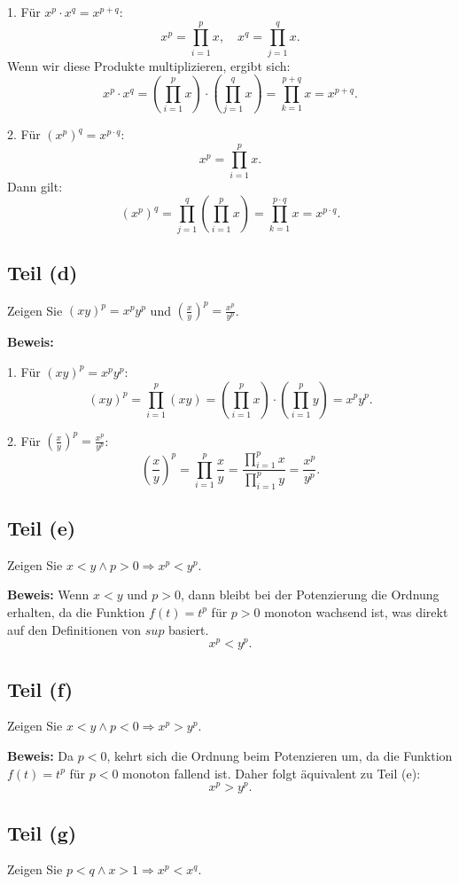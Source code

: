 \documentclass[11pt]{article}
\begin{document}
1. Für \( x^p \cdot x^q = x^{p+q} \):
   \[
   x^p = \prod_{i=1}^{p} x, \quad x^q = \prod_{j=1}^{q} x.
   \]
   Wenn wir diese Produkte multiplizieren, ergibt sich:
   \[
   x^p \cdot x^q = \left( \prod_{i=1}^{p} x \right) \cdot \left( \prod_{j=1}^{q} x \right) = \prod_{k=1}^{p+q} x = x^{p+q}.
   \]

2. Für \( (x^p)^q = x^{p \cdot q} \):
   \[
   x^p = \prod_{i=1}^{p} x.
   \]
   Dann gilt:
   \[
   (x^p)^q = \prod_{j=1}^{q} \left( \prod_{i=1}^{p} x \right) = \prod_{k=1}^{p \cdot q} x = x^{p \cdot q}.
   \]

\subsection*{Teil (d)}
Zeigen Sie \( (xy)^p = x^p y^p \) und \( \left( \frac{x}{y} \right)^p = \frac{x^p}{y^p} \).

\textbf{Beweis:}

1. Für \( (xy)^p = x^p y^p \):
   \[
   (xy)^p = \prod_{i=1}^{p} (xy) = \left( \prod_{i=1}^{p} x \right) \cdot \left( \prod_{i=1}^{p} y \right) = x^p y^p.
   \]

2. Für \( \left( \frac{x}{y} \right)^p = \frac{x^p}{y^p} \):
   \[
   \left( \frac{x}{y} \right)^p = \prod_{i=1}^{p} \frac{x}{y} = \frac{\prod_{i=1}^{p} x}{\prod_{i=1}^{p} y} = \frac{x^p}{y^p}.
   \]

\subsection*{Teil (e)}
Zeigen Sie \( x < y \land p > 0 \Rightarrow x^p < y^p \).

\textbf{Beweis:} Wenn \(x < y\) und \(p>0\), dann bleibt bei der Potenzierung die Ordnung erhalten, da die Funktion \(f(t)=t^p\) für \(p > 0\) monoton wachsend ist, was direkt auf den Definitionen von \(sup\) basiert.
\[
x^p < y^p.
\]

\subsection*{Teil (f)}
Zeigen Sie \( x < y \land p < 0 \Rightarrow x^p > y^p \).

\textbf{Beweis:} Da \( p < 0 \), kehrt sich die Ordnung beim Potenzieren um, da die Funktion \(f(t)=t^p\) für \(p < 0\) monoton fallend ist. Daher folgt äquivalent zu Teil (e):
\[
x^p > y^p.
\]

\subsection*{Teil (g)}
Zeigen Sie \( p < q \land x > 1 \Rightarrow x^p < x^q \).
\end{document}
